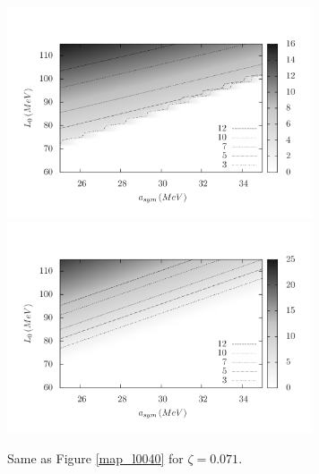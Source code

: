\documentclass[twocolumn,showpacs,aps]{revtex4}
\begin{document}
\begin{figure}[ht]
\centering
  \includegraphics[width=9cm]{map_l0071_gr.png}
    \centering
  \includegraphics[width=9cm]{map_l0071_gd.png}
    \caption{Same as Figure \ref{map_l0040} for $\zeta=0.071$. }\label{map_l0071}
\end{figure} 
\end{document}

